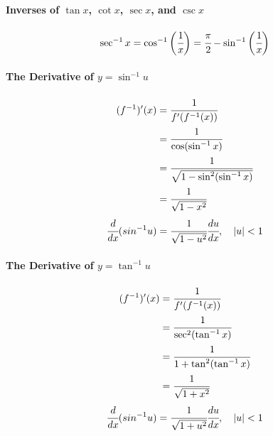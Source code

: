 \documentclass{article}
\begin{document}
            \paragraph{Inverses of $\tan x$, $\cot x$, $\sec x$, and $\csc x$}
            \[\sec^{-1}x=\cos ^{-1}\bigg(\cfrac{1}{x}\bigg)=\cfrac{\pi}{2}-\sin^{-1}\bigg(\cfrac{1}{x}\bigg)\]
            \paragraph{The Derivative of $y=\sin ^{-1} u$}
            \begin{equation}
                \begin{aligned}
                    (f^{-1})'(x)&=\cfrac{1}{f'(f^{-1}(x))}\\
                    &=\cfrac{1}{\cos (\sin ^{-1}x)}\\
                    &=\cfrac{1}{\sqrt{1-\sin ^2(\sin ^{-1}x)}}\\
                    &=\cfrac{1}{\sqrt{1-x^2}}
                \end{aligned}
            \end{equation}
            \[\cfrac{d}{dx}(sin^{-1}u)=\cfrac{1}{\sqrt{1-u^2}}\cfrac{du}{dx},\quad |u|<1\]
            \paragraph{The Derivative of $y=\tan ^{-1} u$}
            \begin{equation}
                \begin{aligned}
                    (f^{-1})'(x)&=\cfrac{1}{f'(f^{-1}(x))}\\
                    &=\cfrac{1}{\sec^2(\tan^{-1}x)}\\
                    &=\cfrac{1}{1+\tan^2(\tan^{-1}x)}\\
                    &=\cfrac{1}{\sqrt{1+x^2}}
                \end{aligned}
            \end{equation}
            \[\cfrac{d}{dx}(sin^{-1}u)=\cfrac{1}{\sqrt{1+u^2}}\cfrac{du}{dx},\quad |u|<1\]
\end{document}
